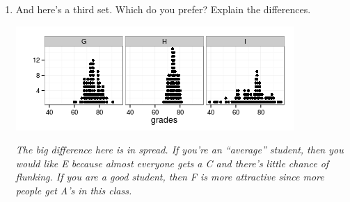 \begin{enumerate}
\begin{key}
  {\it Class H has more A's than C's, so it's the wise choice.  I
    seems evenly split to high and low grades, while G seems to have
    lots of low grades.}
\end{key}
     
   \item  And here's a third set.  Which do you prefer?  Explain the
     differences.  
     
    \includegraphics[width=.9\linewidth]{plots/3classGradeCompareSD.png}
\begin{students}
    \vspace{3cm}    
\end{students}

\begin{key}
  {\it The big difference here is in spread.  If you're an ``average''
  student, then you would like E because almost everyone gets a C and
  there's little chance of flunking.  If you are a good student, then
  F is more attractive since more people get A's in this class.}
\end{key}
  

\end{enumerate}
